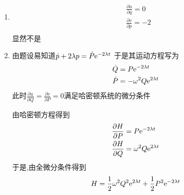 \begin{solution}
    \begin{enumerate}[label=(\arabic*)]
        \item \begin{align*}
            &\frac{\partial u}{\partial q}=0\\
            &\frac{\partial v}{\partial p}=-2\\
              \end{align*}
        显然不是
        \item 由题设易知道$\dot p+2\lambda p=\dot P \mathrm e^{-2\lambda t}$
        于是其运动方程写为
        \begin{align*}
            \dot Q&=P\mathrm e^{-2\lambda t}\\
            \dot P&=-\omega^2 Q\mathrm e^{2\lambda t}
        \end{align*}
        此时$\frac{\partial u}{\partial Q}=\frac{\partial v}{\partial P}=0$满足哈密顿系统的微分条件

        由哈密顿方程得到
        \begin{align*}
            \frac{\partial H}{\partial P}&=P\mathrm e^{-2\lambda t}\\
            \frac{\partial H}{\partial Q}&=\omega^2 Q\mathrm e^{2\lambda t}
        \end{align*}
        于是,由全微分条件得到
        $$H=\frac12 \omega^2 Q^2\mathrm e^{2\lambda t}+\frac12 P^2\mathrm e^{-2\lambda t}$$
    \end{enumerate}
\end{solution}
